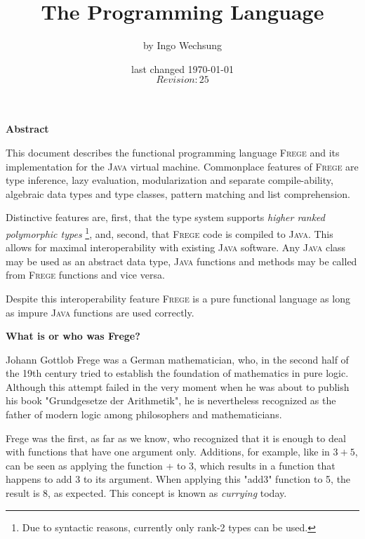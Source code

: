 \documentclass[a4paper,twocolumn,landscape]{report}
\date{last changed \today{} \\ $Revision: 25 $}
\author{\small{by Ingo Wechsung}}
\title{The \frege{} Programming Language}
\newcommand{\inmargin}[1]{\marginpar{\scriptsize\raggedright #1}}
\newcommand{\frege}[0]{\textsc{Frege}}
\newcommand{\java}{\textsc{Java}}
\newcommand{\qq}[1]{"#1"}
\begin{document}
\maketitle

\begin{twocolumn}

\begin{center}\textbf{Abstract}\end{center}
This document describes the functional programming language \frege{}
and its implementation
for the \java{} virtual machine. Commonplace features of \frege{} are
type inference,
lazy evaluation,
modularization and separate compile-ability,
algebraic data types and type classes,
pattern matching and list comprehension.

Distinctive features are, first, that the type system supports
\emph{higher ranked polymorphic types}
\footnote{Due to syntactic reasons, currently only rank-2 types can be used.},
and, second,
that \frege{} code is compiled to \java{}.
This allows for maximal interoperability with existing
\java{} software.
Any \java{} class may be used as an abstract data type, \java{}
functions and methods may be called from \frege{} functions and vice
versa.

Despite this interoperability feature  \frege{} is a pure functional language as long as impure \java{} functions are used correctly.

\begin{center}\textbf{What is or who was Frege?}\end{center}

Johann Gottlob Frege
was a
German mathematician, who, in the second half of the 19th
century tried to establish the foundation of mathematics in pure
logic. Although this attempt failed in the very moment when he
was about to publish his book \qq{Grundgesetze der Arithmetik},
he is nevertheless recognized as the father of modern logic among
philosophers and mathematicians.

Frege was the first, as far as we know, who recognized that it
is enough to deal with functions that have one argument only.
Additions, for example, like in $3+5$, can be seen as applying the
function + to 3,
which results in a function that
happens to add 3 to its argument. When applying this \qq{add3}
function to 5, the result is 8, as expected. This concept is known as
\emph{currying}  today.


\end{twocolumn}
\end{document}
